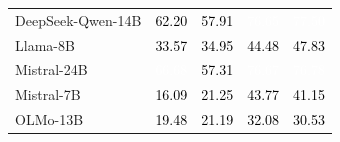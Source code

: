 \begin{figure}[H]
\begin{tabular}{lcccc}
DeepSeek-Qwen-14B & \cellcolor[HTML]{8697BE}\textcolor{black}{62.20} & \cellcolor[HTML]{8E9EC2}\textcolor{black}{57.91} & \cellcolor[HTML]{697EAE}\textcolor{white}{76.65} & \cellcolor[HTML]{677DAD}\textcolor{white}{77.50} \\

Llama-8B & \cellcolor[HTML]{BDC6DB}\textcolor{black}{33.57} & \cellcolor[HTML]{BBC5DA}\textcolor{black}{34.95} & \cellcolor[HTML]{A9B6D1}\textcolor{black}{44.48} & \cellcolor[HTML]{A1AFCD}\textcolor{black}{47.83} \\

Mistral-24B & \cellcolor[HTML]{7C8FB9}\textcolor{white}{66.68} & \cellcolor[HTML]{90A0C3}\textcolor{black}{57.31} & \cellcolor[HTML]{697EAE}\textcolor{white}{76.67} & \cellcolor[HTML]{697EAE}\textcolor{white}{76.78} \\

Mistral-7B & \cellcolor[HTML]{E0E4EE}\textcolor{black}{16.09} & \cellcolor[HTML]{D6DCE9}\textcolor{black}{21.25} & \cellcolor[HTML]{A9B6D1}\textcolor{black}{43.77} & \cellcolor[HTML]{AFBBD4}\textcolor{black}{41.15} \\

OLMo-13B & \cellcolor[HTML]{DADFEB}\textcolor{black}{19.48} & \cellcolor[HTML]{D6DCE9}\textcolor{black}{21.19} & \cellcolor[HTML]{C1CADD}\textcolor{black}{32.08} & \cellcolor[HTML]{C3CBDE}\textcolor{black}{30.53} \\

\bottomrule
\end{tabular}
\end{figure}
